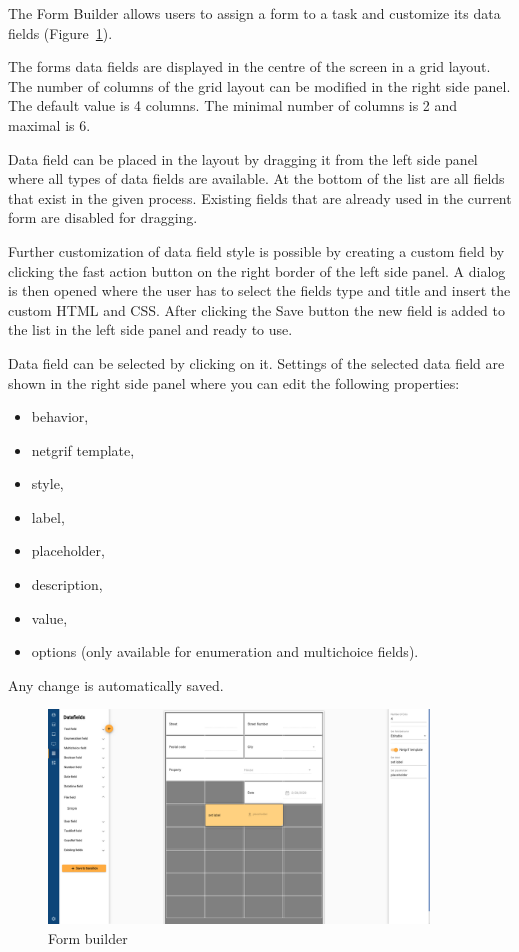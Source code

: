 The Form Builder allows users to assign a form to a task and customize its data fields (Figure~\ref{fig:form_builder}).

The forms data fields are displayed in the centre of the screen in a grid layout.
The number of columns of the grid layout can be modified in the right side panel.
The default value is 4 columns.
The minimal number of columns is 2 and maximal is 6.

Data field can be placed in the layout by dragging it from the left side panel where all types of data fields are available.
At the bottom of the list are all fields that exist in the given process.
Existing fields that are already used in the current form are disabled for dragging.

Further customization of data field style is possible by creating a custom field by clicking the fast action button on the right border of the left side panel.
A dialog is then opened where the user has to select the fields type and title and insert the custom HTML and CSS\@.
After clicking the Save button the new field is added to the list in the left side panel and ready to use.

Data field can be selected by clicking on it.
Settings of the selected data field are shown in the right side panel where you can edit the following properties:
\begin{itemize}
  \item behavior,
  \item netgrif template,
  \item style,
  \item label,
  \item placeholder,
  \item description,
  \item value,
  \item options (only available for enumeration and multichoice fields).
\end{itemize}
Any change is automatically saved.

\begin{figure}[h!]
  \centering
  \includegraphics[width=0.9\textwidth]{images/form_view.png}
  \caption{Form builder}
  \label{fig:form_builder}
\end{figure}
